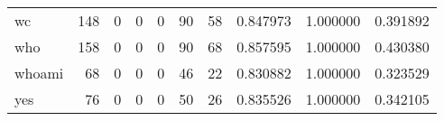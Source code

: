\begin{tabular}{lrrrrrrrrr}
wc        &                                   148 &                                                  0 &                                                  0 &                                                  0 &                                                 90 &                                                 58 &                                           0.847973 &                               1.000000 &                             0.391892 \\
who       &                                   158 &                                                  0 &                                                  0 &                                                  0 &                                                 90 &                                                 68 &                                           0.857595 &                               1.000000 &                             0.430380 \\
whoami    &                                    68 &                                                  0 &                                                  0 &                                                  0 &                                                 46 &                                                 22 &                                           0.830882 &                               1.000000 &                             0.323529 \\
yes       &                                    76 &                                                  0 &                                                  0 &                                                  0 &                                                 50 &                                                 26 &                                           0.835526 &                               1.000000 &                             0.342105 \\
\bottomrule
\end{tabular}
